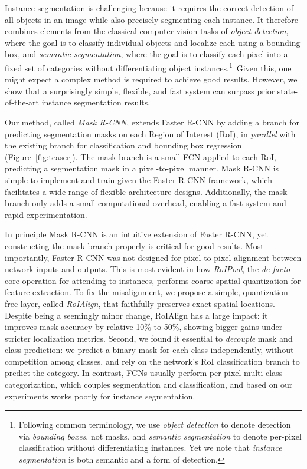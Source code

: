Instance segmentation is challenging because it requires the correct detection of all objects in an image while also precisely segmenting each instance. It therefore combines elements from the classical computer vision tasks of \emph{object detection}, where the goal is to classify individual objects and localize each using a bounding box, and \emph{semantic segmentation}, where the goal is to classify each pixel into a fixed set of categories without differentiating object instances.\footnote{Following common terminology, we use \emph{object detection} to denote detection via \emph{bounding boxes}, not masks, and \emph{semantic segmentation} to denote per-pixel classification without differentiating instances. Yet we note that \emph{instance segmentation} is both semantic and a form of detection.}~Given this, one might expect a complex method is required to achieve good results. However, we show that a surprisingly simple, flexible, and fast system can surpass prior state-of-the-art instance segmentation results.

Our method, called \emph{Mask R-CNN}, extends Faster R-CNN by adding a branch for predicting segmentation masks on each Region of Interest (RoI), in \emph{parallel} with the existing branch for classification and bounding box regression (Figure~\ref{fig:teaser}). The mask branch is a small FCN applied to each RoI, predicting a segmentation mask in a pixel-to-pixel manner. Mask R-CNN is simple to implement and train given the Faster R-CNN framework, which facilitates a wide range of flexible architecture designs. Additionally, the mask branch only adds a small computational overhead, enabling a fast system and rapid experimentation.

In principle Mask R-CNN is an intuitive extension of Faster R-CNN, yet constructing the mask branch properly is critical for good results. Most importantly, Faster R-CNN was not designed for pixel-to-pixel alignment between network inputs and outputs. This is most evident in how \emph{RoIPool}, the \emph{de facto} core operation for attending to instances, performs coarse spatial quantization for feature extraction. To fix the misalignment, we propose a simple, quantization-free layer, called \emph{RoIAlign}, that faithfully preserves exact spatial locations. Despite being a seemingly minor change, RoIAlign has a large impact: it improves mask accuracy by relative 10\% to 50\%, showing bigger gains under stricter localization metrics. Second, we found it essential to \emph{decouple} mask and class prediction: we predict a binary mask for each class independently, without competition among classes, and rely on the network's RoI classification branch to predict the category. In contrast, FCNs usually perform per-pixel multi-class categorization, which couples segmentation and classification, and based on our experiments works poorly for instance segmentation.

